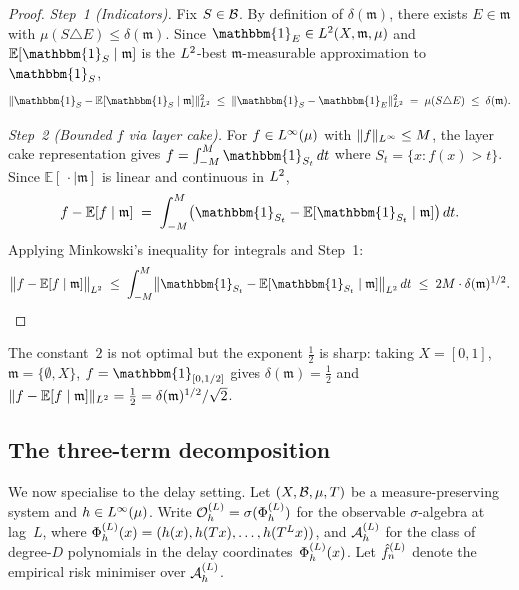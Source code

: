 \begin{proof}
\emph{Step~1 (Indicators).}
Fix $S \in \mathcal{B}$.
By definition of $\delta(\mathfrak{m})$, there exists $E \in \mathfrak{m}$
with $\mu(S \triangle E) \leq \delta(\mathfrak{m})$.
Since $\mathbbm{1}_E \in \Lp{2}(X, \mathfrak{m}, \mu)$ and
$\mathbb{E}[\mathbbm{1}_S \mid \mathfrak{m}]$ is the $L^{2}$-best
$\mathfrak{m}$-measurable approximation to $\mathbbm{1}_S$,
\[
  \|\mathbbm{1}_S - \mathbb{E}[\mathbbm{1}_S \mid \mathfrak{m}]\|_{\Lp{2}}^2
  \;\leq\;
  \|\mathbbm{1}_S - \mathbbm{1}_E\|_{\Lp{2}}^2
  \;=\; \mu(S \triangle E) \;\leq\; \delta(\mathfrak{m}).
\]

\emph{Step~2 (Bounded $f$ via layer cake).}
For $f \in L^{\infty}(\mu)$ with $\|f\|_{L^{\infty}} \leq M$, the layer
cake representation gives $f = \int_{-M}^{M} \mathbbm{1}_{S_t}\,dt$ where
$S_t = \{x : f(x) > t\}$.
Since $\mathbb{E}[\,\cdot\mid \mathfrak{m}]$ is linear and continuous in $L^{2}$,
\[
  f - \mathbb{E}[f \mid \mathfrak{m}]
  \;=\; \int_{-M}^{M}
    \bigl(\mathbbm{1}_{S_t} - \mathbb{E}[\mathbbm{1}_{S_t} \mid \mathfrak{m}]\bigr)\,dt.
\]
Applying Minkowski's inequality for integrals and Step~1:
\[
  \bigl\|f - \mathbb{E}[f \mid \mathfrak{m}]\bigr\|_{\Lp{2}}
  \;\leq\; \int_{-M}^{M}
    \bigl\|\mathbbm{1}_{S_t} - \mathbb{E}[\mathbbm{1}_{S_t} \mid \mathfrak{m}]\bigr\|_{\Lp{2}}\,dt
  \;\leq\; 2M \cdot \delta(\mathfrak{m})^{1/2}. \qedhere
\]
\end{proof}

\begin{remark}
The constant~$2$ is not optimal but the exponent $\frac{1}{2}$ is sharp:
taking $X = [0,1]$, $\mathfrak{m} = \{\emptyset, X\}$, $f = \mathbbm{1}_{[0,1/2]}$
gives $\delta(\mathfrak{m}) = \frac{1}{2}$ and
$\|f - \mathbb{E}[f \mid \mathfrak{m}]\|_{L^{2}} = \frac{1}{2} = \delta(\mathfrak{m})^{1/2}/\sqrt{2}$.
\end{remark}

\subsection{The three-term decomposition}
\label{subsec:three-term}

We now specialise to the delay setting.
Let $(X, \mathcal{B}, \mu, T)$ be a measure-preserving system and $h \in L^{\infty}(\mu)$.
Write $\mathcal{O}_h^{(L)} = \sigma(\Phi_h^{(L)})$ for the observable $\sigma$-algebra at lag~$L$, where
$\Phi_h^{(L)}(x) = (h(x), h(Tx), \ldots, h(T^L x))$,
and $\mathcal{A}_h^{(L)}$ for the class of degree-$D$ polynomials in the delay
coordinates~$\Phi_h^{(L)}(x)$.
Let $\hat{f}_n^{(L)}$ denote the empirical risk minimiser over $\mathcal{A}_h^{(L)}$.

